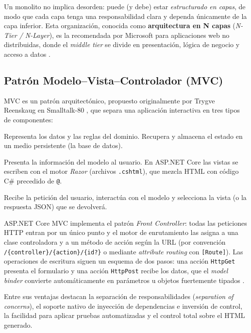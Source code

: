 \documentclass[12pt,letterpaper]{article}
\begin{document}
Un monolito no implica desorden: puede (y debe) estar \emph{estructurado en capas}, de
modo que cada capa tenga una responsabilidad clara y dependa únicamente de la capa
inferior. Esta organización, conocida como \textbf{arquitectura en N capas}
(\emph{N-Tier / N-Layer}), es la recomendada por Microsoft para aplicaciones web no
distribuidas, donde el \emph{middle tier} se divide en presentación, lógica de negocio y
acceso a datos \cite{msarchguide}.

\subsection{Patrón Modelo--Vista--Controlador (MVC)}
MVC es un patrón arquitectónico, propuesto originalmente por Trygve Reenskaug en Smalltalk-80
\cite{reenskaug}, que separa una aplicación interactiva en tres tipos de componentes:

\begin{description}[itemsep=2pt]
  \item[Modelo] Representa los datos y las reglas del dominio. Recupera y almacena el
        estado en un medio persistente (la base de datos).
  \item[Vista] Presenta la información del modelo al usuario. En ASP.NET Core las vistas
        se escriben con el motor \emph{Razor} (archivos \texttt{.cshtml}), que mezcla HTML
        con código C\# precedido de \texttt{@}.
  \item[Controlador] Recibe la petición del usuario, interactúa con el modelo y selecciona
        la vista (o la respuesta JSON) que se devolverá.
\end{description}

ASP.NET Core MVC implementa el patrón \emph{Front Controller}: todas las peticiones HTTP
entran por un único punto y el motor de enrutamiento las asigna a una clase controladora
y a un método de acción según la URL (por convención \texttt{/\{controller\}/\{action\}/\{id?\}}
o mediante \emph{attribute routing} con \texttt{[Route]}). Las operaciones de escritura
siguen un esquema de dos pasos: una acción \texttt{HttpGet} presenta el formulario y una
acción \texttt{HttpPost} recibe los datos, que el \emph{model binder} convierte
automáticamente en parámetros u objetos fuertemente tipados \cite{aspnetmvc}.

Entre sus ventajas destacan la separación de responsabilidades (\emph{separation of
concerns}), el soporte nativo de inyección de dependencias e inversión de control, la
facilidad para aplicar pruebas automatizadas y el control total sobre el HTML generado.
\end{document}
